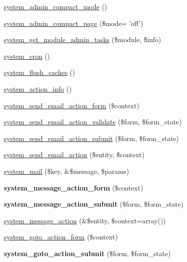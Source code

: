 \begin{DoxyCompactItemize}
\item 
\hyperlink{system_8module_a5c5f93aebe3f12a47ceab948b0a92237}{system\_\-admin\_\-compact\_\-mode} ()
\item 
\hyperlink{system_8module_ab1957cfd893fb50794286ea7c84589e6}{system\_\-admin\_\-compact\_\-page} (\$mode= 'off')
\item 
\hyperlink{system_8module_a121a9c5ed0a44d3c0adc1c60368972ab}{system\_\-get\_\-module\_\-admin\_\-tasks} (\$module, \$info)
\item 
\hyperlink{system_8module_aaf72e35b8cb67cfe762abe4132f84c3f}{system\_\-cron} ()
\item 
\hyperlink{system_8module_ae38c371e6c9eba87278d135ad16c9d33}{system\_\-flush\_\-caches} ()
\item 
\hyperlink{system_8module_aeea00f3322d9a388335950f421935835}{system\_\-action\_\-info} ()
\item 
\hyperlink{system_8module_acdc88b46eee866f535e90f0cb9a6114a}{system\_\-send\_\-email\_\-action\_\-form} (\$context)
\item 
\hyperlink{system_8module_a667002aa61b3826726f5a2274d8f3f27}{system\_\-send\_\-email\_\-action\_\-validate} (\$form, \$form\_\-state)
\item 
\hyperlink{system_8module_aa51bb7d880590588296057b0f0b7c1ff}{system\_\-send\_\-email\_\-action\_\-submit} (\$form, \$form\_\-state)
\item 
\hyperlink{group__actions_gae09a4cd8054571b9ac3659adccfac574}{system\_\-send\_\-email\_\-action} (\$entity, \$context)
\item 
\hyperlink{system_8module_a33bdb754ad2acfe55063e5114d05a68b}{system\_\-mail} (\$key, \&\$message, \$params)
\item 
\hypertarget{system_8module_a60e4c89cccf66cebe08f5379458bae82}{
{\bfseries system\_\-message\_\-action\_\-form} (\$context)}
\label{system_8module_a60e4c89cccf66cebe08f5379458bae82}

\item 
\hypertarget{system_8module_a59a3178db4ff0a80381534081fc732b7}{
{\bfseries system\_\-message\_\-action\_\-submit} (\$form, \$form\_\-state)}
\label{system_8module_a59a3178db4ff0a80381534081fc732b7}

\item 
\hyperlink{group__actions_ga5dd09e03b155bd9ad1ef0dad464661e3}{system\_\-message\_\-action} (\&\$entity, \$context=array())
\item 
\hyperlink{system_8module_a9e66ce1cf0a4a3529a1a3140fdbe4660}{system\_\-goto\_\-action\_\-form} (\$context)
\item 
\hypertarget{system_8module_afdacb2efc1f7256ab44cdf1e4869bf8e}{
{\bfseries system\_\-goto\_\-action\_\-submit} (\$form, \$form\_\-state)}
\label{system_8module_afdacb2efc1f7256ab44cdf1e4869bf8e}


\end{DoxyCompactItemize}

